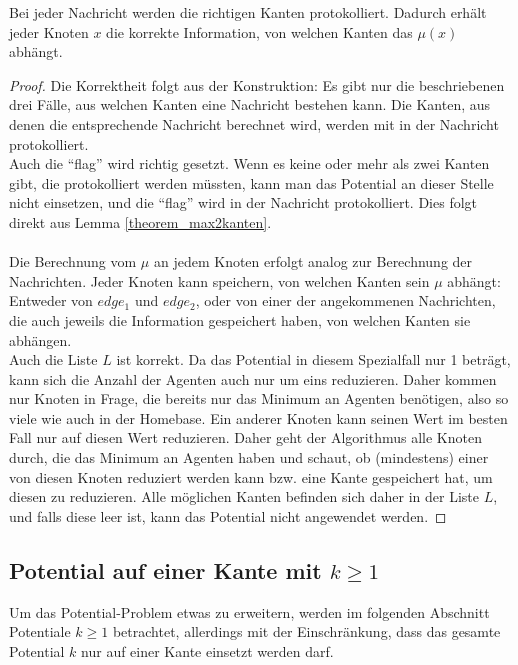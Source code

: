 	\begin{theorem}
		Bei jeder Nachricht werden die richtigen Kanten protokolliert. Dadurch erhält jeder Knoten $x$ die korrekte Information, von welchen Kanten das $\mu(x)$ abhängt. 
	\end{theorem}
	\begin{proof}
		Die Korrektheit folgt aus der Konstruktion: Es gibt nur die beschriebenen drei Fälle, aus welchen Kanten eine Nachricht bestehen kann. Die Kanten, aus denen die entsprechende Nachricht berechnet wird, werden mit in der Nachricht protokolliert.\\
		Auch die "`flag"' wird richtig gesetzt. Wenn es keine oder mehr als zwei Kanten gibt, die protokolliert werden müssten, kann man das Potential an dieser Stelle nicht einsetzen, und die "`flag"' wird in der Nachricht protokolliert. Dies folgt direkt aus Lemma \ref{theorem_max2kanten}.
		\\
		\\
		Die Berechnung vom $\mu$ an jedem Knoten erfolgt analog zur Berechnung der Nachrichten. Jeder Knoten kann speichern, von welchen Kanten sein $\mu$ abhängt: Entweder von $edge_{1}$ und $edge_{2}$, oder von einer der angekommenen Nachrichten, die auch jeweils die Information gespeichert haben, von welchen Kanten sie abhängen.\\
		Auch die Liste $L$ ist korrekt. Da das Potential in diesem Spezialfall nur 1 beträgt, kann sich die Anzahl der Agenten auch nur um eins reduzieren. Daher kommen nur Knoten in Frage, die bereits nur das Minimum an Agenten benötigen, also so viele wie auch in der Homebase. Ein anderer Knoten kann seinen Wert im besten Fall nur auf diesen Wert reduzieren. Daher geht der Algorithmus alle Knoten durch, die das Minimum an Agenten haben und schaut, ob (mindestens) einer von diesen Knoten reduziert werden kann bzw. eine Kante gespeichert hat, um diesen zu reduzieren. Alle möglichen Kanten befinden sich daher in der Liste $L$, und falls diese leer ist, kann das Potential nicht angewendet werden.
		
	\end{proof}


\subsection{Potential auf einer Kante mit $k \geq 1$}\label{kap_pot>=1}


Um das Potential-Problem etwas zu erweitern, werden im folgenden Abschnitt Potentiale $k \geq 1$ betrachtet, allerdings mit der Einschränkung, dass das gesamte Potential $k$ nur auf einer Kante einsetzt werden darf.

